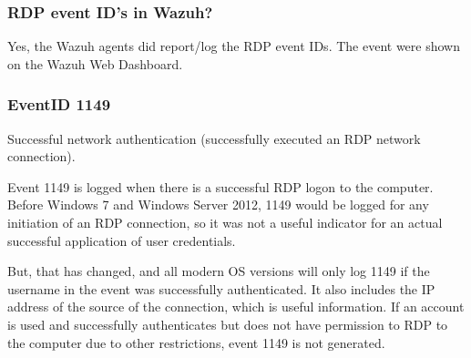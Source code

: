 \subsubsection{RDP event ID's in Wazuh?}
Yes, the Wazuh agents did report/log the RDP event IDs. The event were shown on the Wazuh Web Dashboard.

\columnbreak

\subsubsection{EventID 1149}
Successful network authentication (successfully executed an RDP network connection).

Event 1149 is logged when there is a successful RDP logon to the computer. Before Windows 7 and Windows Server 2012, 1149 would be logged for any initiation of an RDP connection, so it was not a useful indicator for an actual successful application of user credentials.

But, that has changed, and all modern OS versions will only log 1149 if the username in the event was successfully authenticated. It also includes the IP address of the source of the connection, which is useful information. If an account is used and successfully authenticates but does not have permission to RDP to the computer due to other restrictions, event 1149 is not generated.

